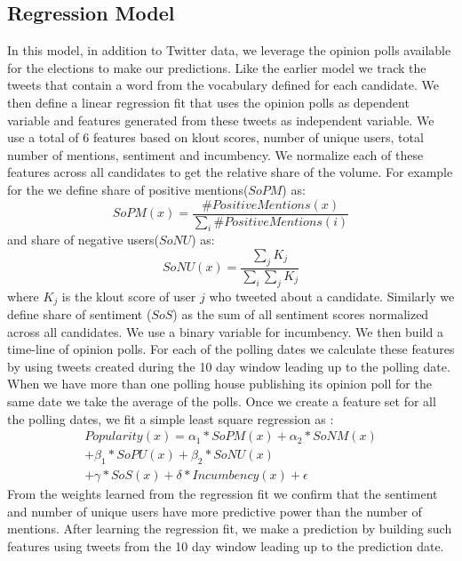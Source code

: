 \subsection{Regression Model}
In this model, in addition to Twitter data, we leverage the opinion polls available for the elections to make our predictions.
Like the earlier model we track the tweets that contain a word from the vocabulary defined for each candidate.
We then define a linear regression fit that uses the opinion polls as dependent variable and features generated from these tweets as independent variable.
We use a total of 6 features based on klout scores, number of unique users, total number of mentions, sentiment and incumbency.
We normalize each of these features across all candidates to get the relative share of the volume. 
For example for the we define share of positive mentions($SoPM$)  as: 
\begin{equation}
SoPM(x) = \frac{\#PositiveMentions(x)}{\sum_i \#PositiveMentions(i)} 
\end{equation}
and share of negative users($SoNU$) as:
\begin{equation}
SoNU(x) = \frac{\sum_j K_j}{\sum_i \sum_j K_j}
\end{equation}
where $K_j$ is the klout score of user $j$ who tweeted about a candidate.
Similarly we define share of sentiment ($SoS$) as the sum of all sentiment scores normalized across all candidates. 
We use a binary variable for incumbency. 
We then build a time-line of opinion polls. 
For each of the polling dates we calculate these features by using tweets created during the 10 day window leading up to the polling date.
When we have more than one polling house publishing its opinion poll for the same date we take the average of the polls. 
Once we create a feature set for all the polling dates, we fit a simple least square regression as :
\begin{equation}
\begin{split}
Popularity(x) = \alpha_1 * SoPM(x) + \alpha_2 * SoNM(x) \\
						 + \beta_1 * SoPU(x) + \beta_2 * SoNU(x) \\
						 + \gamma * SoS(x) + \delta * Incumbency(x) + \epsilon
\end{split}
\end{equation}
From the  weights learned from the regression fit we confirm that the sentiment and number of unique users have more predictive power than the number of mentions.	
After learning the regression fit, we make a prediction by building such features using tweets from the 10 day window leading up to the prediction date.
